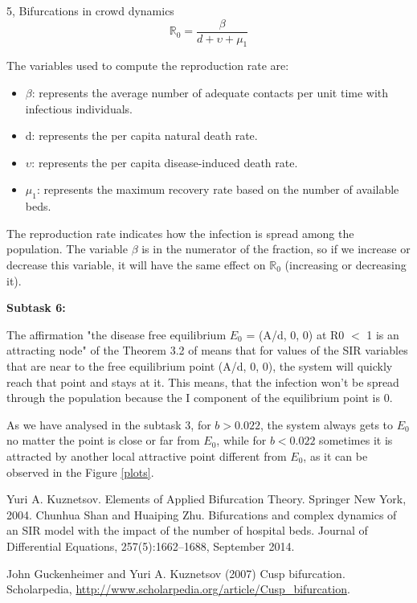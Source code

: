 \documentclass[10pt,a4paper]{article}
\begin{document}
\begin{task}{5, Bifurcations in crowd dynamics }
\begin{equation}\label{rr}
    \mathbb{R}_0 = \frac{\beta}{d + \upsilon + \mu_1}
\end{equation}

\noindent The variables used to compute the reproduction rate are:

\begin{itemize}
  \item $\beta$: represents the average number of adequate contacts per unit time with infectious individuals.
  \item d: represents the per capita natural death rate.
  \item $\upsilon$: represents the per capita disease-induced death rate.
  \item $\mu_1$: represents the maximum recovery rate based on the number of available beds.
\end{itemize} 

\noindent The reproduction rate indicates how the infection is spread among the population. The variable $\beta$ is in the numerator of the fraction, so if we increase or decrease this variable, it will have the same effect on $\mathbb{R}_0$ (increasing or decreasing it). 

\bigskip

\noindent \textbf{Subtask 6:} 

The affirmation "the disease free equilibrium $E_0$ = (A/d, 0, 0) at R0 $<$ 1 is an attracting node" of the Theorem 3.2 of \cite{Chunhua} means that for values of the SIR variables that are near to the free equilibrium point (A/d, 0, 0), the system will quickly reach that point and stays at it. This means, that the infection won't be spread through the population because the I component of the equilibrium point is 0.

As we have analysed in the subtask 3, for $b > 0.022$, the system always gets to $E_0$ no matter the point is close or far from $E_0$, while for $b < 0.022$ sometimes it is attracted by another local attractive point different from $E_0$, as it can be observed in the Figure \ref{plots}.  

\end{task}

\newpage
\begin{thebibliography}{9}
Yuri A. Kuznetsov. Elements of Applied Bifurcation Theory. Springer New York, 2004.
Chunhua Shan and Huaiping Zhu. Bifurcations and complex dynamics of an SIR model with the impact of the number of hospital beds. Journal of Differential Equations, 257(5):1662–1688, September 2014.

John Guckenheimer and Yuri A. Kuznetsov (2007) Cusp bifurcation. Scholarpedia, {\url{http://www.scholarpedia.org/article/Cusp_bifurcation}}.

\end{thebibliography}




\end{document}
